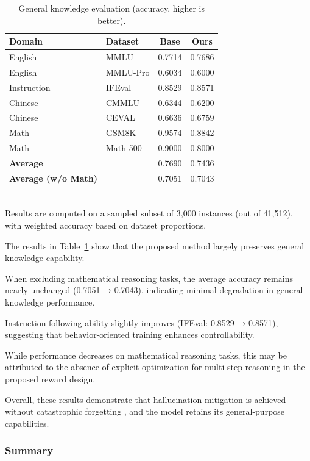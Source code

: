 \begin{table}[h]
\centering
\caption{General knowledge evaluation (accuracy, higher is better).}
\label{tab:general_knowledge}
\begin{tabular}{l l c c}
\toprule
Domain & Dataset & Base & Ours \\
\midrule
English & MMLU     & 0.7714 & 0.7686 \\
English & MMLU-Pro & 0.6034 & 0.6000 \\
Instruction & IFEval & 0.8529 & 0.8571 \\
Chinese & CMMLU    & 0.6344 & 0.6200 \\
Chinese & CEVAL    & 0.6636 & 0.6759 \\
Math & GSM8K       & 0.9574 & 0.8842 \\
Math & Math-500    & 0.9000 & 0.8000 \\
\midrule
\textbf{Average} &  & 0.7690 & 0.7436 \\
\textbf{Average (w/o Math)} &  & 0.7051 & 0.7043 \\
\bottomrule
\end{tabular}
\\
\footnotesize{
Results are computed on a sampled subset of 3,000 instances (out of 41,512), with weighted accuracy based on dataset proportions.
}
\end{table}

The results in Table~\ref{tab:general_knowledge} show that the proposed method largely preserves general knowledge capability.

When excluding mathematical reasoning tasks, the average accuracy remains nearly unchanged (0.7051 → 0.7043), 
indicating minimal degradation in general knowledge performance.

Instruction-following ability slightly improves (IFEval: 0.8529 → 0.8571), 
suggesting that behavior-oriented training enhances controllability.

While performance decreases on mathematical reasoning tasks, 
this may be attributed to the absence of explicit optimization for multi-step reasoning in the proposed reward design.

Overall, these results demonstrate that hallucination mitigation is achieved without catastrophic forgetting \cite{EWC}, 
and the model retains its general-purpose capabilities.

\subsubsection{Summary}

